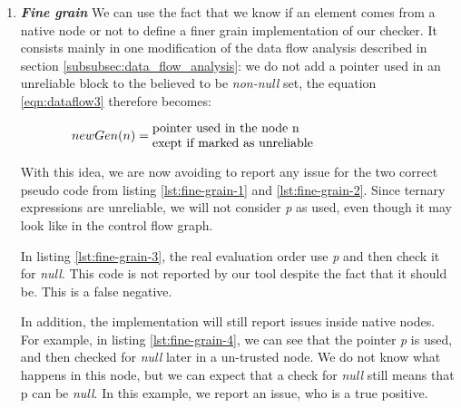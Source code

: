 \begin{enumerate}
\item \textbf{\textit{Fine grain}} \newline
We can use the fact that we know if an element comes from a native node or not to define a finer grain implementation of our checker. 
It consists mainly in one modification of the data flow analysis described in section \ref{subsubsec:data_flow_analysis}: we do not add a pointer used in an unreliable block to the believed to be \emph{non-null} set, the equation \eqref{eqn:dataflow3} therefore becomes:

\begin{equation}\label{eqn:new_dataflow4}
newGen(n) = \parbox{7cm}{pointer used in the node n\newline exept if marked as unreliable}
\end{equation}





With this idea, we are now avoiding to report any issue for the two correct pseudo code from listing \ref{lst:fine-grain-1} and \ref{lst:fine-grain-2}. Since ternary expressions are unreliable, we will not consider \emph{p} as used, even though it may look like in the control flow graph.



In listing \ref{lst:fine-grain-3}, the real evaluation order use \emph{p} and then check it for \emph{null}. 
This code is not reported by our tool despite the fact that it should be. This is a false negative.\newline



In addition, the implementation will still report issues inside native nodes.
For example, in listing \ref{lst:fine-grain-4}, we can see that the pointer \emph{p} is used, and then checked for \emph{null} later in a un-trusted node. 
We do not know what happens in this node, but we can expect that a check for \emph{null} still means that p can be \emph{null}. 
In this example, we report an issue, who is a true positive.
\end{enumerate}

